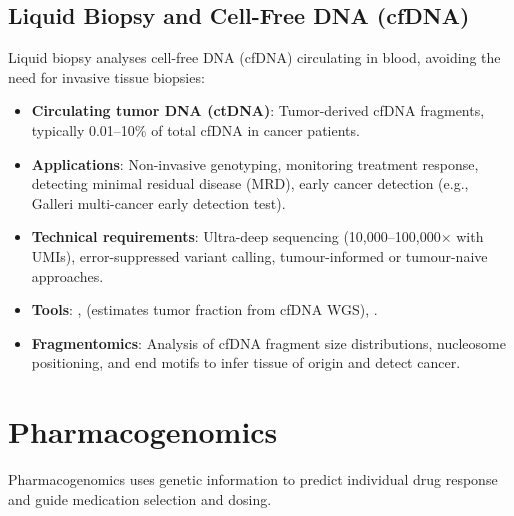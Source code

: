 \subsection{Liquid Biopsy and Cell-Free DNA (cfDNA)}

Liquid biopsy analyses cell-free DNA (cfDNA) circulating in blood, avoiding the need for invasive tissue biopsies:

\begin{itemize}[nosep]
  \item \textbf{Circulating tumor DNA (ctDNA)}: Tumor-derived cfDNA fragments, typically 0.01--10\% of total cfDNA in cancer patients.
  \item \textbf{Applications}: Non-invasive genotyping, monitoring treatment response, detecting minimal residual disease (MRD), early cancer detection (e.g., Galleri multi-cancer early detection test).
  \item \textbf{Technical requirements}: Ultra-deep sequencing (10,000--100,000$\times$ with UMIs), error-suppressed variant calling, tumour-informed or tumour-naive approaches.
  \item \textbf{Tools}: ,  (estimates tumor fraction from cfDNA WGS), .
  \item \textbf{Fragmentomics}: Analysis of cfDNA fragment size distributions, nucleosome positioning, and end motifs to infer tissue of origin and detect cancer.
\end{itemize}

\section{Pharmacogenomics}
\label{sec:pharmacogenomics}

Pharmacogenomics uses genetic information to predict individual drug response and guide medication selection and dosing.

